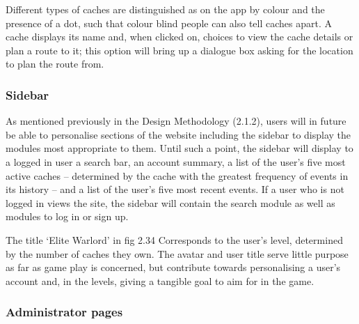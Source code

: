 Different types of caches are distinguished as on the app by colour and the presence of a dot, such that colour blind people can also tell caches apart. A cache displays its name and, when clicked on, choices to view the cache details or plan a route to it; this option will bring up a dialogue box asking for the location to plan the route from.

\subsubsection{Sidebar}

As mentioned previously in the Design Methodology (2.1.2), users will in future be able to personalise sections of the website including the sidebar to display the modules most appropriate to them. Until such a point, the sidebar will display to a logged in user a search bar, an account summary, a list of the user’s five most active caches – determined by the cache with the greatest frequency of events in its history – and a list of the user’s five most recent events. If a user who is not logged in views the site, the sidebar will contain the search module as well as modules to log in or sign up.

The title ‘Elite Warlord’ in fig 2.34 Corresponds to the user’s level, determined by the number of caches they own. The avatar and user title serve little purpose as far as game play is concerned, but contribute towards personalising a user’s account and, in the levels, giving a tangible goal to aim for in the game.

\subsubsection{Administrator pages}

